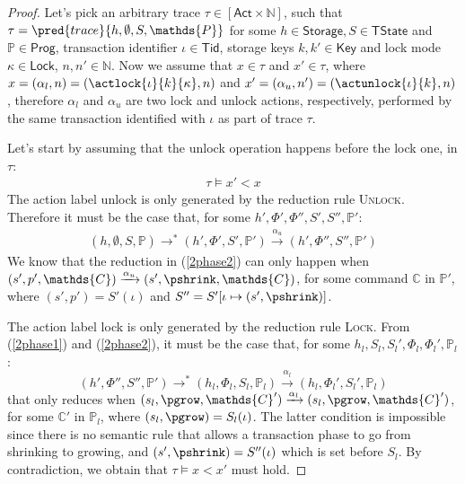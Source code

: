 \begin{proof}
Let's pick an arbitrary trace $\tau \in [\mathsf{Act} \times \mathds{N}]$, such that $\tau = \pred{trace}{h, \emptyset, S, \mathds{P}}$ for some $h \in \mathsf{Storage}, S \in \mathsf{TState}$ and $\mathds{P} \in \mathsf{Prog}$, transaction identifier $\iota \in \mathsf{Tid}$, storage keys $k, k' \in \mathsf{Key}$ and lock mode $\kappa \in \mathsf{Lock}$, $n, n' \in \mathds{N}$. Now we assume that  $x \in \tau$ and $x' \in \tau$, where $x = (\alpha_l, n) = (\actlock{\iota}{k}{\kappa}, n)$ and $x' = (\alpha_u, n') = (\actunlock{\iota}{k}, n)$, therefore $\alpha_l$ and $\alpha_u$ are two lock and unlock actions, respectively, performed by the same transaction identified with $\iota$ as part of trace $\tau$.

Let's start by assuming that the unlock operation happens before the lock one, in $\tau$:
\begin{gather}
	\label{2phase1}
	\tau \vDash x' < x
\end{gather}
The action label \textsf{unlock} is only generated by the reduction rule \textsc{Unlock}. Therefore it must be the case that, for some $h', \Phi', \Phi'', S', S'', \mathds{P}'$:
\begin{gather}
	\label{2phase2}
	(h, \emptyset, S, \mathds{P}) \rightarrow^* (h', \Phi', S', \mathds{P}') \xrightarrow{\alpha_u} (h', \Phi'', S'', \mathds{P}')
\end{gather}
We know that the reduction in (\ref{2phase2}) can only happen when $(s', p', \mathds{C}) \xrightarrow{\alpha_u} (s', \pshrink, \mathds{C})$, for some command $\mathds{C}$ in $\mathds{P}'$, where $(s', p') = S'(\iota)$ and $S'' = S'[\iota \mapsto (s', \pshrink)]$.

The action label \textsf{lock} is only generated by the reduction rule \textsc{Lock}. From (\ref{2phase1}) and (\ref{2phase2}), it must be the case that, for some $h_l, S_l, S_l', \Phi_l, \Phi_l', \mathds{P}_l$:
\[
	(h', \Phi'', S'', \mathds{P}') \rightarrow^* (h_l, \Phi_l, S_l, \mathds{P}_l) \xrightarrow{\alpha_l} (h_l, \Phi_l', S_l', \mathds{P}_l)
\]
that only reduces when $(s_l, \pgrow, \mathds{C}') \xrightarrow{\alpha_l} (s_l, \pgrow, \mathds{C}')$, for some $\mathds{C}'$ in $\mathds{P}_l$, where $(s_l, \pgrow) = S_l(\iota)$. The latter condition is impossible since there is no semantic rule that allows a transaction phase to go from shrinking to growing, and $(s', \pshrink) = S''(\iota)$ which is set before $S_l$. By contradiction, we obtain that $\tau \vDash x < x'$ must hold.
\end{proof}

